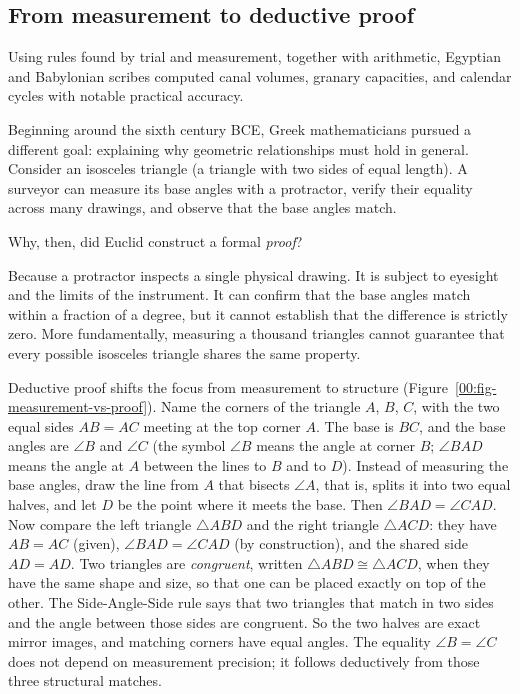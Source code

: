 \subsection*{From measurement to deductive proof}

Using rules found by trial and measurement, together with arithmetic, Egyptian and Babylonian scribes computed canal volumes, granary capacities, and calendar cycles with notable practical accuracy.

Beginning around the sixth century BCE, Greek mathematicians pursued a different goal: explaining why geometric relationships must hold in general. Consider an isosceles triangle (a triangle with two sides of equal length). A surveyor can measure its base angles with a protractor, verify their equality across many drawings, and observe that the base angles match.

Why, then, did Euclid construct a formal \emph{proof}?

Because a protractor inspects a single physical drawing. It is subject to eyesight and the limits of the instrument. It can confirm that the base angles match within a fraction of a degree, but it cannot establish that the difference is strictly zero. More fundamentally, measuring a thousand triangles cannot guarantee that every possible isosceles triangle shares the same property.

Deductive proof shifts the focus from measurement to structure (Figure~\ref{00:fig-measurement-vs-proof}). Name the corners of the triangle $A$, $B$, $C$, with the two equal sides $AB = AC$ meeting at the top corner $A$. The base is $BC$, and the base angles are $\angle B$ and $\angle C$ (the symbol $\angle B$ means the angle at corner $B$; $\angle BAD$ means the angle at $A$ between the lines to $B$ and to $D$). Instead of measuring the base angles, draw the line from $A$ that bisects $\angle A$, that is, splits it into two equal halves, and let $D$ be the point where it meets the base. Then $\angle BAD = \angle CAD$. Now compare the left triangle $\triangle ABD$ and the right triangle $\triangle ACD$: they have $AB = AC$ (given), $\angle BAD = \angle CAD$ (by construction), and the shared side $AD = AD$. Two triangles are \emph{congruent}, written $\triangle ABD \cong \triangle ACD$, when they have the same shape and size, so that one can be placed exactly on top of the other. The Side-Angle-Side rule says that two triangles that match in two sides and the angle between those sides are congruent. So the two halves are exact mirror images, and matching corners have equal angles. The equality $\angle B = \angle C$ does not depend on measurement precision; it follows deductively from those three structural matches.

